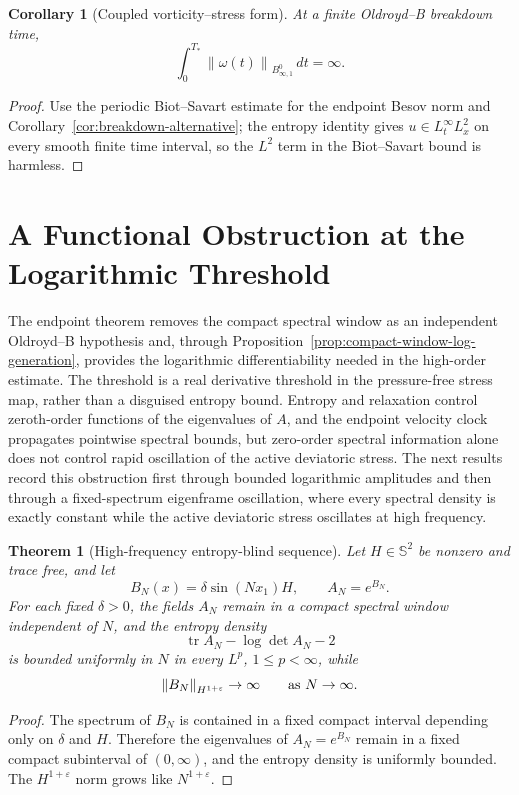 \documentclass[11pt]{article}
\newtheorem{theorem}{Theorem}[section]
\newtheorem{corollary}{Corollary}[section]
\newcommand{\Sym}{\mathbb S}
\newcommand{\tr}{\operatorname{tr}}
\newcommand{\norm}[1]{\left\lVert #1\right\rVert}
\begin{document}
\begin{corollary}[Coupled vorticity--stress form]
\label{cor:coupled}
At a finite Oldroyd--B breakdown time,
\[
  \int_0^{T_*}\norm{\omega(t)}_{B^0_{\infty,1}}\,dt=\infty .
\]
\end{corollary}

\begin{proof}
Use the periodic Biot--Savart estimate for the endpoint Besov norm and
Corollary~\ref{cor:breakdown-alternative}; the entropy identity gives
\(u\in L^\infty_tL^2_x\) on every smooth finite time interval, so the \(L^2\)
term in the Biot--Savart bound is harmless.
\end{proof}

\section{A Functional Obstruction at the Logarithmic Threshold}
\label{sec:no-go}

The endpoint theorem removes the compact spectral window as an independent
Oldroyd--B hypothesis and, through Proposition~\ref{prop:compact-window-log-generation},
provides the logarithmic differentiability needed in the high-order estimate.
The threshold is a real derivative threshold in the pressure-free stress map,
rather than a disguised entropy bound.  Entropy and relaxation control zeroth-order
functions of the eigenvalues of \(A\), and the endpoint velocity clock
propagates pointwise spectral bounds, but zero-order spectral information alone
does not control rapid oscillation of the active deviatoric stress.  The next
results record this obstruction first through bounded logarithmic amplitudes
and then through a fixed-spectrum eigenframe oscillation, where every spectral
density is exactly constant while the active deviatoric stress oscillates at
high frequency.

\begin{theorem}[High-frequency entropy-blind sequence]
\label{thm:no-go}
Let \(H\in\Sym^2\) be nonzero and trace free, and let
\[
  B_N(x)=\delta\sin(Nx_1)H,\qquad A_N=e^{B_N}.
\]
For each fixed \(\delta>0\), the fields \(A_N\) remain in a compact spectral
window independent of \(N\), and the entropy density
\[
  \tr A_N-\log\det A_N-2
\]
is bounded uniformly in \(N\) in every \(L^p\), \(1\le p<\infty\), while
\[
  \norm{B_N}_{H^{1+\varepsilon}}\to\infty
  \qquad\hbox{as }N\to\infty .
\]
\end{theorem}

\begin{proof}
The spectrum of \(B_N\) is contained in a fixed compact interval depending only
on \(\delta\) and \(H\).  Therefore the eigenvalues of \(A_N=e^{B_N}\) remain in
a fixed compact subinterval of \((0,\infty)\), and the entropy density is
uniformly bounded.  The \(H^{1+\varepsilon}\) norm grows like
\(N^{1+\varepsilon}\).
\end{proof}
\end{document}
